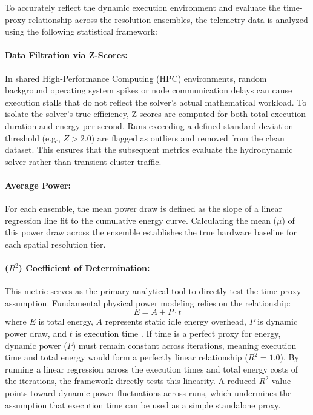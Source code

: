 To accurately reflect the dynamic execution environment and evaluate the time-proxy relationship across the resolution ensembles, the telemetry data is analyzed using the following statistical framework:

\paragraph{Data Filtration via Z-Scores:}
In shared High-Performance Computing (HPC) environments, random background operating system spikes or node communication delays can cause execution stalls that do not reflect the solver's actual mathematical workload. To isolate the solver's true efficiency, Z-scores are computed for both total execution duration and energy-per-second. Runs exceeding a defined standard deviation threshold (e.g., $Z > 2.0$) are flagged as outliers and removed from the clean dataset. This ensures that the subsequent metrics evaluate the hydrodynamic solver rather than transient cluster traffic.

\paragraph{Average Power:}
For each ensemble, the mean power draw is defined as the slope of a linear regression line fit to the cumulative energy curve. Calculating the mean ($\mu$) of this power draw across the ensemble establishes the true hardware baseline for each spatial resolution tier.

\paragraph{($R^2$) Coefficient of Determination:}
This metric serves as the primary analytical tool to directly test the time-proxy assumption. Fundamental physical power modeling relies on the relationship:
\begin{equation}
E = A + P \cdot t
\label{eq:energy_power_time}
\end{equation}
where $E$ is total energy, $A$ represents static idle energy overhead, $P$ is dynamic power draw, and $t$ is execution time \cite{Tian2014}.
If time is a perfect proxy for energy, dynamic power ($P$) must remain constant across iterations, meaning execution time and total energy would form a perfectly linear relationship ($R^2 = 1.0$). By running a linear regression across the execution times and total energy costs of the iterations, the framework directly tests this linearity. A reduced $R^2$ value points toward dynamic power fluctuations across runs, which undermines the assumption that execution time can be used as a simple standalone proxy.

